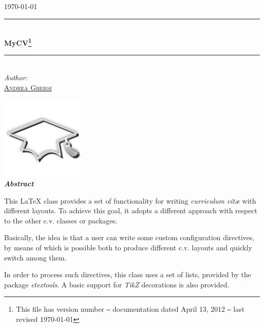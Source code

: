 \documentclass[
   10pt,
   a4paper,oneside,openany,
   titlepage,
   fleqn,
   headinclude,footinclude,
   BCOR5mm,
   numbers=noenddot,
   cleardoublepage=empty,
   captions=tableheading
   \ifdraft
   ,draft
   \else
   \fi
]{scrreprt}
\makeatletter
\newcommand{\myTitle}{MyCV\xspace}
\newcommand{\myName}{Andrea Ghersi\xspace}
\newcommand{\myMail}{ghanhawk@gmail.com}
\makeatother
\begin{document}
\pagestyle{useheadings}
\pagestyle{plain}


\begin{titlepage}
\begin{center}

\renewcommand{\thefootnote}{\fnsymbol{footnote}}
\newcommand{\HRule}{\rule{\linewidth}{0.5mm}}

\def\versionMsg{This file has version number \version{} \texttt{---} %
   documentation dated April 13, 2012 \texttt{---} %
   last revised \today}

\textsc{\large\color{gray}\today}\\[0.5cm]

\HRule\\[0.4cm]%
{\huge\medskip\bfseries\myTitle\footnote{\versionMsg}}\\[0.4cm]%
\HRule\\[1.5cm]

\large\emph{Author:}\\
\href{mailto:\myMail}{\textsc{\myName}}

\vspace{20pt}
\includegraphics[width=0.30\textwidth]{Images/logo-1.png}\\[1cm]

\vspace{10pt}
\textbf{\textit{Abstract}}\normalsize\par\bigskip
\begin{minipage}{0.75\textwidth}
\noindent
This \LaTeX{} class provides a set of functionality for writing \textit{curriculum vit\ae{}}
with different layouts. To achieve this goal, it adopts a different approach with respect
to the other c.v. classes or packages.

Basically, the idea is that a user can write some custom configuration directives, by means of which
is possible both to produce different c.v. layouts and quickly switch among them.

In order to process such directives, this class uses a set of lists, provided by the package
\textit{etextools}. A basic support for \textit{TikZ} decorations is also provided.

\end{minipage}

\renewcommand{\thefootnote}{\arabic{footnote}}\setcounter{footnote}{0}

\end{center}
\end{titlepage}
\pagestyle{scrheadings}
\end{document}
